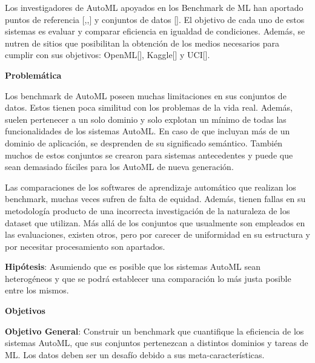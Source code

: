 Los investigadores de AutoML apoyados en los Benchmark de ML han aportado puntos de referencia [\cite{10},\cite{15},\cite{31}] y conjuntos de datos [\cite{28}]. 
El objetivo de cada uno de estos sistemas es evaluar y comparar eficiencia en igualdad de condiciones. Además, se nutren de sitios que posibilitan la obtención de los 
medios necesarios para cumplir con sus objetivos: OpenML[\cite{43}], Kaggle[\cite{44}] y UCI[\cite{45}].

\begin{flushleft} 
    {\Large { \textbf{Problemática}}}
\end{flushleft}
Los benchmark de AutoML poseen muchas limitaciones en sus conjuntos de datos. Estos tienen poca similitud con los problemas de la vida real. Además, suelen 
pertenecer a un solo dominio y solo explotan un mínimo de todas las funcionalidades de los sistemas AutoML. En caso de que incluyan más de un dominio de aplicación, 
se desprenden de su significado semántico. También muchos de estos conjuntos se crearon para sistemas antecedentes y puede que sean demasiado fáciles para los AutoML 
de nueva generación.

Las comparaciones de los softwares de aprendizaje automático que realizan los benchmark, muchas veces sufren de falta de equidad. Además, tienen fallas en su 
metodología producto de una incorrecta investigación de la naturaleza de los dataset que utilizan. Más allá de los conjuntos que usualmente son empleados en las 
evaluaciones, existen otros, pero por carecer de uniformidad en su estructura y por necesitar procesamiento son apartados.


\textbf{Hipótesis}: Asumiendo que es posible que los sistemas AutoML sean heterogéneos y que se podrá establecer una comparación lo más 
justa posible entre los mismos.

\begin{flushleft} 
    {\Large {\textbf{Objetivos}}}
\end{flushleft}

\textbf{Objetivo General}: Construir un benchmark que cuantifique la eficiencia de los sistemas AutoML, que sus conjuntos pertenezcan a distintos dominios y tareas 
de ML. Los datos deben ser un desafío debido a sus meta-características.



